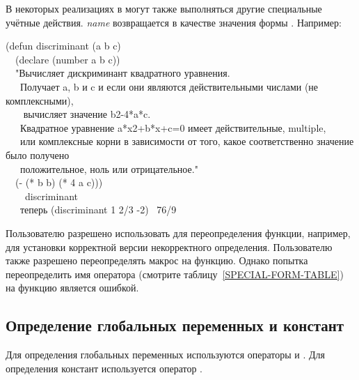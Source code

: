 \begin{defmac}
В некоторых реализациях в  могут также выполняться другие специальные
учётные действия. \emph{name} возвращается в качестве значения формы .
Например:
\begin{lisp}
(defun discriminant (a b c) \\
~~(declare (number a b c)) \\
~~"Вычисляет дискриминант квадратного уравнения. \\
~~~Получает a, b и c и если они являются действительными числами (не комплексными), \\
~~~ вычисляет значение b{\Xcircumflex}2-4*a*c. \\
~~~Квадратное уравнение a*x{\Xcircumflex}2+b*x+c=0 имеет действительные, multiple, \\
~~~или комплексные корни в зависимости от того, какое соответственно значение было получено \\
~~~положительное, ноль или отрицательное." \\
~~(- (* b b) (* 4 a c))) \\
~~~\EV\ discriminant \\
~~~\textrm{теперь} (discriminant 1 2/3 -2) \EV\ 76/9
\end{lisp}

Пользователю разрешено использовать  для переопределения функции, например, для
установки корректной версии некорректного определения.
Пользователю также разрешено переопределять макрос на функцию.
Однако попытка переопределить имя оператора (смотрите
таблицу~\ref{SPECIAL-FORM-TABLE}) на функцию является ошибкой.
\end{defmac}

\subsection{Определение глобальных переменных и констант}

Для определения глобальных переменных используются операторы
 и . 
Для определения констант используется оператор . 

